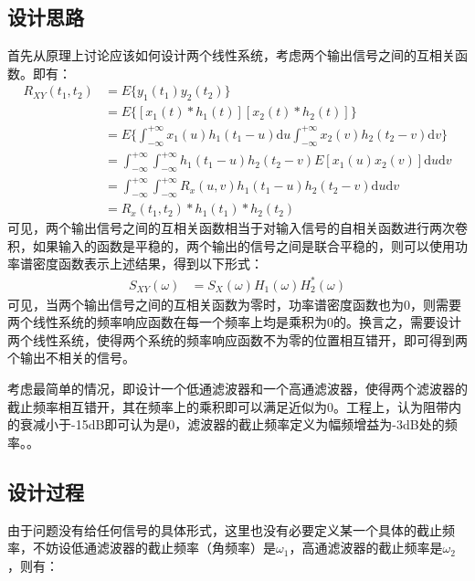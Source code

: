 \documentclass[11pt]{article}
\begin{document}
\subsection{设计思路}
首先从原理上讨论应该如何设计两个线性系统，考虑两个输出信号之间的互相关函数。即有：
\begin{equation}
  \begin{aligned}
    R_{XY}(t_1,t_2) & =E\{y_1(t_1)y_2(t_2)\}                                                                                               \\
                    & =E\{[x_1(t)*h_1(t)][x_2(t)*h_2(t)]\}                                                                                 \\
                    & =E\Big\{\int_{-\infty}^{+\infty}x_1(u)h_1(t_1-u)\mathrm{d}u\int_{-\infty}^{+\infty}x_2(v)h_2(t_2-v)\mathrm{d}v\Big\} \\
                    & =\int_{-\infty}^{+\infty}\int_{-\infty}^{+\infty}h_1(t_1-u)h_2(t_2-v)E[x_1(u)x_2(v)]\mathrm{d}u\mathrm{d}v           \\
                    & =\int_{-\infty}^{+\infty}\int_{-\infty}^{+\infty}R_x(u,v)h_1(t_1-u)h_2(t_2-v)\mathrm{d}u\mathrm{d}v                  \\
                    & =R_x(t_1,t_2)*h_1(t_1)*h_2(t_2)
  \end{aligned}
\end{equation}
可见，两个输出信号之间的互相关函数相当于对输入信号的自相关函数进行两次卷积，如果输入的函数是平稳的，两个输出的信号之间是联合平稳的，则可以使用功率谱密度函数表示上述结果，得到以下形式：
\begin{equation}
  \begin{aligned}
    S_{XY}(\omega) & =S_X(\omega)H_1(\omega)H_2^*(\omega)
  \end{aligned}
\end{equation}
可见，当两个输出信号之间的互相关函数为零时，功率谱密度函数也为0，则需要两个线性系统的频率响应函数在每一个频率上均是乘积为0的。换言之，需要设计两个线性系统，使得两个系统的频率响应函数不为零的位置相互错开，即可得到两个输出不相关的信号。

考虑最简单的情况，即设计一个低通滤波器和一个高通滤波器，使得两个滤波器的截止频率相互错开，其在频率上的乘积即可以满足近似为0。工程上，认为阻带内的衰减小于-15dB即可认为是0，滤波器的截止频率定义为幅频增益为-3dB处的频率。\cite{signal_system}。
\subsection{设计过程}
由于问题没有给任何信号的具体形式，这里也没有必要定义某一个具体的截止频率，不妨设低通滤波器的截止频率（角频率）是$\omega_1$，高通滤波器的截止频率是$\omega_2$，则有：
\end{document}
